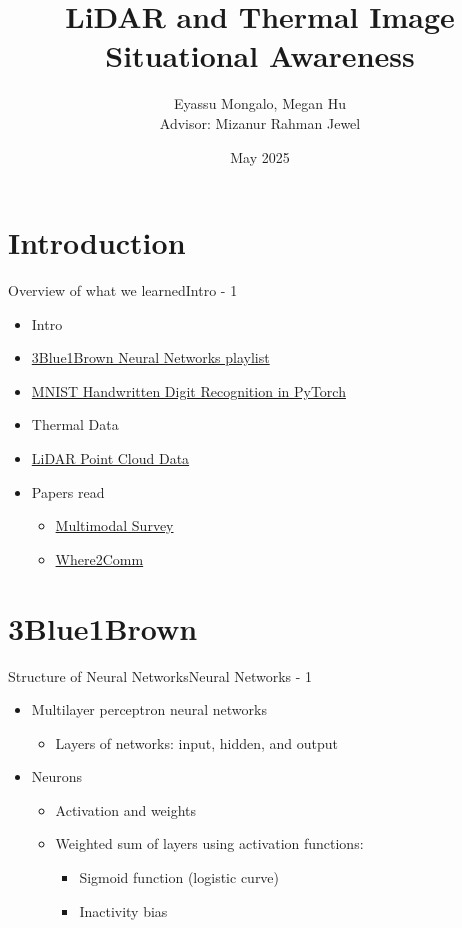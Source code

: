 \documentclass{beamer}
\title{LiDAR and Thermal Image Situational Awareness}
\author{\texorpdfstring{Eyassu Mongalo, Megan Hu \\ \small Advisor: Mizanur Rahman Jewel}
    {Eyassu Mongalo, Megan Hu, Advisor: Mizanur Rahman Jewel}}
\date{May 2025}
\begin{document}
	\maketitle
	\section{Introduction}
		\begin{frame}{Overview of what we learned}{Intro - 1}
			\begin{itemize}
				\item Intro
				\item \href{https://www.youtube.com/playlist?list=PLZHQObOWTQDNU6R1_67000Dx_ZCJB-3pi}{3Blue1Brown Neural Networks playlist}
				\item \href{https://nextjournal.com/gkoehler/pytorch-mnist}{MNIST Handwritten Digit Recognition in PyTorch}
				\item Thermal Data
				\item \href{https://www.faro.com/en/Resource-Library/Article/Point-Clouds-for-Beginners}{LiDAR Point Cloud Data}
				\item Papers read
				\begin{itemize}
					\item \href{https://ieeexplore.ieee.org/stamp/stamp.jsp?arnumber=10123038}{Multimodal Survey}
					\item \href{https://proceedings.neurips.cc/paper_files/paper/2022/file/1f5c5cd01b864d53cc5fa0a3472e152e-Paper-Conference.pdf}{Where2Comm}
				\end{itemize}
			\end{itemize}
		\end{frame}

	\section{3Blue1Brown}
		\begin{frame}{Structure of Neural Networks}{Neural Networks - 1}
			\begin{itemize}
				\item Multilayer perceptron neural networks 
				\begin{itemize}
					\item Layers of networks: input, hidden, and output
				\end{itemize}
				
				\item Neurons 
				\begin{itemize}
					\item Activation and weights
					\item Weighted sum of layers using activation functions:
					\begin{itemize}
						\item Sigmoid function (logistic curve)
						\item Inactivity bias
					\end{itemize}
				\end{itemize}
			\end{itemize}
		\end{frame}
\end{document}
